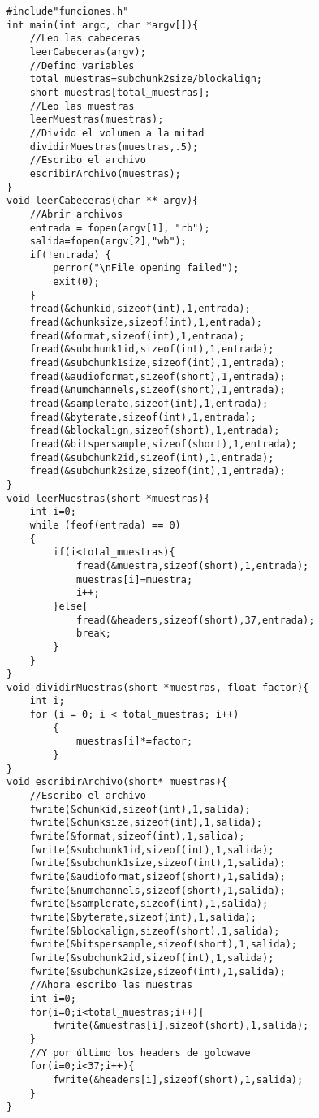 \begin{lstlisting}[style=CStyle]
#include"funciones.h"
int main(int argc, char *argv[]){
	//Leo las cabeceras
	leerCabeceras(argv);
	//Defino variables
	total_muestras=subchunk2size/blockalign;
	short muestras[total_muestras];
	//Leo las muestras
	leerMuestras(muestras);
	//Divido el volumen a la mitad
	dividirMuestras(muestras,.5);
	//Escribo el archivo
	escribirArchivo(muestras);
}
void leerCabeceras(char ** argv){
	//Abrir archivos
	entrada = fopen(argv[1], "rb");
	salida=fopen(argv[2],"wb");
	if(!entrada) {
		perror("\nFile opening failed");
		exit(0);
	}
	fread(&chunkid,sizeof(int),1,entrada);
	fread(&chunksize,sizeof(int),1,entrada);
	fread(&format,sizeof(int),1,entrada);
	fread(&subchunk1id,sizeof(int),1,entrada);
	fread(&subchunk1size,sizeof(int),1,entrada);
	fread(&audioformat,sizeof(short),1,entrada);
	fread(&numchannels,sizeof(short),1,entrada);
	fread(&samplerate,sizeof(int),1,entrada);
	fread(&byterate,sizeof(int),1,entrada);
	fread(&blockalign,sizeof(short),1,entrada);
	fread(&bitspersample,sizeof(short),1,entrada);
	fread(&subchunk2id,sizeof(int),1,entrada);
	fread(&subchunk2size,sizeof(int),1,entrada);
}
void leerMuestras(short *muestras){
	int i=0;
	while (feof(entrada) == 0)
	{
		if(i<total_muestras){
			fread(&muestra,sizeof(short),1,entrada);
			muestras[i]=muestra;
			i++;
		}else{
			fread(&headers,sizeof(short),37,entrada);
			break;
		}
	}
}
void dividirMuestras(short *muestras, float factor){
	int i;
	for (i = 0; i < total_muestras; i++)
		{
			muestras[i]*=factor;
		}
}
void escribirArchivo(short* muestras){
	//Escribo el archivo
	fwrite(&chunkid,sizeof(int),1,salida);
	fwrite(&chunksize,sizeof(int),1,salida);
	fwrite(&format,sizeof(int),1,salida);
	fwrite(&subchunk1id,sizeof(int),1,salida);
	fwrite(&subchunk1size,sizeof(int),1,salida);
	fwrite(&audioformat,sizeof(short),1,salida);
	fwrite(&numchannels,sizeof(short),1,salida);
	fwrite(&samplerate,sizeof(int),1,salida);
	fwrite(&byterate,sizeof(int),1,salida);
	fwrite(&blockalign,sizeof(short),1,salida);
	fwrite(&bitspersample,sizeof(short),1,salida);
	fwrite(&subchunk2id,sizeof(int),1,salida);
	fwrite(&subchunk2size,sizeof(int),1,salida);
	//Ahora escribo las muestras
	int i=0;
	for(i=0;i<total_muestras;i++){
		fwrite(&muestras[i],sizeof(short),1,salida);
	}
	//Y por último los headers de goldwave
	for(i=0;i<37;i++){
		fwrite(&headers[i],sizeof(short),1,salida);
	}
}
\end{lstlisting}
